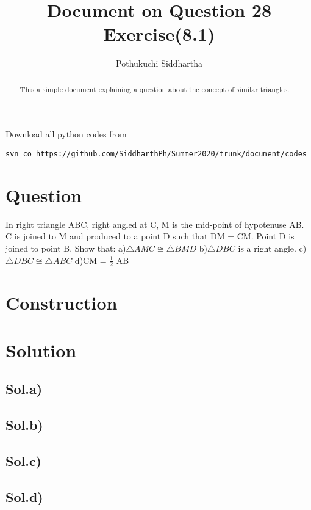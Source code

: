 \documentclass[journal,12pt,twocolumn]{IEEEtran}
\title{Document on Question 28 Exercise(8.1)}
\author{Pothukuchi Siddhartha}
\begin{document}
\maketitle
\begin{abstract}
This a simple document explaining a question about the concept of similar triangles.
\end{abstract}
Download all python codes from 
%


\begin{lstlisting}
svn co https://github.com/SiddharthPh/Summer2020/trunk/document/codes
\end{lstlisting}
%

\section*{\textbf{Question}}
In right triangle ABC, right angled at C, M is
the mid-point of hypotenuse AB. C is joined to
M and produced to a point D such that DM =
CM. Point D is joined to point B. Show that:
\newline
a)$\triangle  AMC  \cong   \triangle  BMD $
\newline
b)$\triangle DBC $ is a right angle.
\newline
c)$\triangle  DBC  \cong  \triangle  ABC $
\newline
d)CM = $\frac{1}{2}$ AB

\section*{\textbf{Construction}}

\section*{\textbf{Solution}}

\subsection*{\textbf{Sol.a)}}

\subsection*{\textbf{Sol.b)}}

\subsection*{\textbf{Sol.c)}}

\subsection*{\textbf{Sol.d)}}

\end{document}
